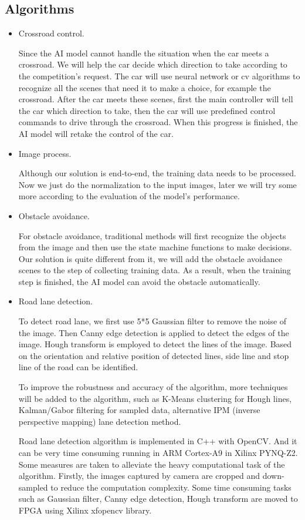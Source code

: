 \documentclass[conference]{IEEEtran}
\begin{document}
\subsection{Algorithms}
\begin{itemize}
\item Crossroad control. 

Since the AI model cannot handle the situation when the car meets a crossroad. We will help the car decide which direction to take according to the competition's request. The car will use neural network or cv algorithms to recognize all the scenes that need it to make a choice, for example the crossroad. After the car meets these scenes, first the main controller will tell the car which direction to take, then the car will use predefined control commands to drive through the crossroad. When this progress is finished, the AI model will retake the control of the car.
\item Image process. 

Although our solution is end-to-end, the training data needs to be processed. Now we just do the normalization to the input images, later we will try some more according to the evaluation of the model's performance.
\item Obstacle avoidance. 

For obstacle avoidance, traditional methods will first recognize the objects from the image and then use the state machine functions to make decisions. Our solution is quite different from it, we will add the obstacle avoidance scenes to the step of collecting training data. As a result, when the training step is finished, the AI model can avoid the obstacle automatically.
\item Road lane detection. 

To detect road lane, we first use 5*5 Gaussian filter to remove the noise of the image. Then Canny edge detection\cite{b14} is applied to detect the edges of the image. Hough transform\cite{b15} is employed to detect the lines of the image. Based on the orientation and relative position of detected lines, side line and stop line of the road can be identified. 

To improve the robustness and accuracy of the algorithm, more techniques will be added to the algorithm, such as K-Means clustering\cite{b16} for Hough lines, Kalman/Gabor filtering for sampled data, alternative IPM (inverse perspective mapping) lane detection method\cite{b17}.

Road lane detection algorithm is implemented in C++ with OpenCV. And it can be very time consuming running in ARM Cortex-A9 in Xilinx PYNQ-Z2. Some measures are taken to alleviate the heavy computational task of the algorithm. Firstly, the images captured by camera are cropped and down-sampled to reduce the computation complexity. Some time consuming tasks such as Gaussian filter, Canny edge detection, Hough transform are moved to FPGA using Xilinx xfopencv library\cite{b18}.


\end{itemize}
\end{document}
